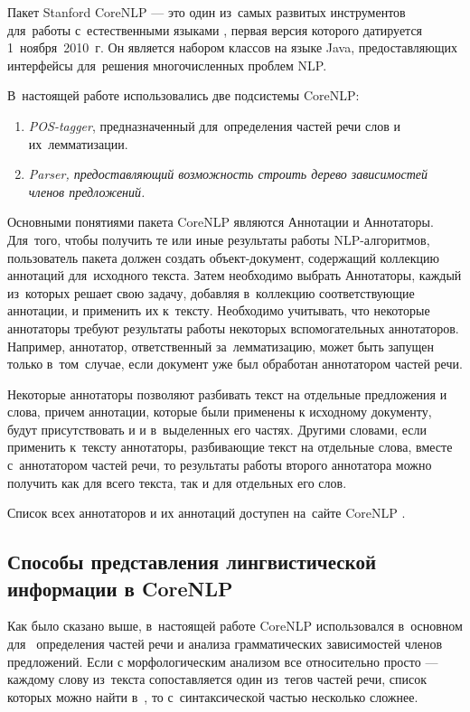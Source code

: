 Пакет Stanford CoreNLP --- это один из~самых развитых инструментов для~работы с~естественными языками \cite{corenlp}, 
первая версия которого датируется 1~ноября~2010~г.
Он является набором классов на языке Java, предоставляющих интерфейсы для~решения многочисленных проблем NLP. 

В~настоящей работе использовались две подсистемы CoreNLP:

\begin{enumerate}

\item {{\it POS-tagger}, предназначенный для~определения частей речи слов и их~лемматизации.}
\item {\it {Parser}, предоставляющий возможность строить дерево зависимостей членов предложений.}

\end{enumerate}

Основными понятиями пакета CoreNLP являются Аннотации и Аннотаторы. 
Для~того, чтобы получить те или иные результаты работы NLP-алгоритмов,
пользователь пакета должен создать объект-документ,
содержащий коллекцию аннотаций для~исходного текста. 
Затем необходимо выбрать Аннотаторы, каждый из~которых решает свою задачу, 
добавляя в~коллекцию соответствующие аннотации, и применить их к~тексту. 
Необходимо учитывать, что некоторые аннотаторы требуют результаты работы некоторых вспомогательных аннотаторов.
Например, аннотатор, ответственный за~лемматизацию, может быть запущен
только в~том~случае, если документ уже был обработан аннотатором частей речи.

Некоторые аннотаторы позволяют разбивать текст на отдельные предложения и слова,
причем аннотации, которые были применены к исходному документу, будут присутствовать и
и в~выделенных его частях. 
Другими словами, если применить к~тексту аннотаторы, разбивающие текст на отдельные слова,
вместе с~аннотатором частей речи, то результаты работы второго аннотатора 
можно получить как для всего текста, так и для отдельных его слов.

Список всех аннотаторов и их аннотаций доступен на~сайте CoreNLP \cite{corenlp}.

\subsection{Способы представления лингвистической информации в CoreNLP}

Как было сказано выше, в~настоящей работе CoreNLP использовался в~основном для~
определения частей речи и анализа грамматических зависимостей членов предложений.
Если с морфологическим анализом все относительно просто ---
 каждому слову из~текста сопоставляется один из~тегов частей речи, список которых можно найти в~\cite{treebank},
то с~синтаксической частью несколько сложнее.

